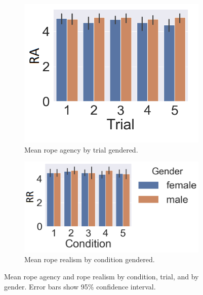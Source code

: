 \begin{figure}[H]
\begin{subfigure}[b]{0.3\textwidth}
     \includegraphics[scale=0.3]{Files/Plots/rotrial_gen.png}
      \caption{Mean rope agency by trial gendered.}
     \label{fig:ropeOwnTrialGend}
 \end{subfigure}
  \hspace{5mm}
  \begin{subfigure}[b]{0.3\textwidth}
     \centering
     \includegraphics[scale=0.35]{Files/Plots/rrcond_gen.png}
     \caption{Mean rope realism by condition gendered.}
     \label{fig:ropeRealCondGend}
 \end{subfigure}
     \caption{Mean rope agency and rope realism by condition, trial, and by gender. Error bars show 95\%  confidence interval.}
    \label{fig:ropeOwnershipRealism}
\end{figure}


